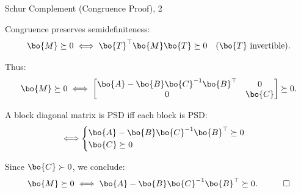 \documentclass{beamer}
\begin{document}
\begin{frame}{Schur Complement (Congruence Proof), 2}
	\begin{flushleft}
		
		
		Congruence preserves semidefiniteness:
		\[
		\bo{M} \succeq 0 
		\;\Longleftrightarrow\;
		\bo{T}^\top \bo{M} \bo{T} \succeq 0
		\quad (\bo{T} \text{ invertible}).
		\]
		
		\bigskip
		
		Thus:
		\[
		\bo{M} \succeq 0
		\;\Longleftrightarrow\;
		\begin{bmatrix}
			\bo{A} - \bo{B}\bo{C}^{-1}\bo{B}^\top & 0 \\
			0 & \bo{C}
		\end{bmatrix} \succeq 0.
		\]
		
		\bigskip
		
		A block diagonal matrix is PSD iff each block is PSD:
		\[
		\Longleftrightarrow
		\begin{cases}
			\bo{A} - \bo{B}\bo{C}^{-1}\bo{B}^\top \succeq 0 \\
			\bo{C} \succeq 0
		\end{cases}
		\]
		
		\bigskip
		
		Since $\bo{C} \succ 0$, we conclude:
		\[
		\bo{M} \succeq 0 
		\;\Longleftrightarrow\;
		\bo{A} - \bo{B}\bo{C}^{-1}\bo{B}^\top \succeq 0. \ \ \ \qed
		\]
		
	\end{flushleft}
\end{frame}
\end{document}
